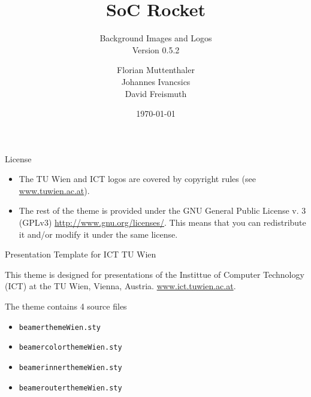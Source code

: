 \documentclass{beamer}
\title[SoC Rocket]{SoC Rocket}
\subtitle{Background Images and Logos\\
Version 0.5.2}
\author{Florian Muttenthaler\\Johannes Ivancsics\\David Freismuth}
\institute[TU Wien]{TU Wien, Vienna, Austria}
\date{\today}
\begin{document}
\begin{frame}
  \titlepage
\end{frame}      


\begin{frame}{License}
  
\begin{itemize}
\item The TU Wien and ICT logos are covered by copyright rules (see
  \href{www.tuwien.ac.at}{www.tuwien.ac.at}).
\item The rest of the theme is provided under the GNU General Public
  License v. 3 (GPLv3) \href{http://www.gnu.org/licenses/}{http://www.gnu.org/licenses/}. This means that you can redistribute it and/or modify it under the same license. 
\end{itemize}
\end{frame}


\begin{frame}{Presentation Template for ICT TU Wien}

  \begin{block}{}
    This theme is designed for presentations of the Instittue of
    Computer Technology (ICT) at the TU Wien, Vienna, Austria.
    \href{www.ict.tuwien.ac.at}{www.ict.tuwien.ac.at}.
  \end{block}

  \vspace{3ex}
  \begin{block}{The theme contains 4 source files}

  \begin{itemize}
  \item  {\tt beamerthemeWien.sty}
  \item  {\tt beamercolorthemeWien.sty}
  \item  {\tt beamerinnerthemeWien.sty}
  \item  {\tt beamerouterthemeWien.sty}
  \end{itemize}
\end{block}
\end{frame} 
\end{document}
